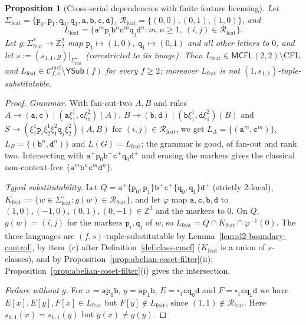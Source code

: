 \documentclass[11pt]{article}
\numberwithin{equation}{section}
\theoremstyle{plain}
\newtheorem{proposition}[theorem]{Proposition}
\theoremstyle{definition}
\theoremstyle{remark}
\newcommand{\Cmcf}[2]{\mathcal{C}^{\mathrm{mcf}}_{#1,#2}}
\newcommand{\blank}{\square}
\newcommand{\YSub}[1]{\mathsf{YSub}(#1)}
\theoremstyle{plain}
\begin{document}
\begin{proposition}[Cross-serial dependencies with finite feature licensing]
\label{prop:feature-cross-typed-v1s}
Let $\Sigma_{\mathrm{feat}}=\{\mathtt p_0,\mathtt p_1,\mathtt q_0,\mathtt q_1,
\mathtt a,\mathtt b,\mathtt c,\mathtt d\}$, $\mathcal R_{\mathrm{feat}}=
\{(0,0),(0,1),(1,0)\}$, and
\[
 L_{\mathrm{feat}}=\{\mathtt a^m\mathtt p_i\mathtt b^n\mathtt c^m\mathtt q_j\mathtt d^n:
 m,n\ge1,\ (i,j)\in\mathcal R_{\mathrm{feat}}\}.
\]
Let $g:\Sigma_{\mathrm{feat}}^*\to\mathbb Z_2^2$ map $\mathtt p_1\mapsto(1,0)$,
$\mathtt q_1\mapsto(0,1)$ and all other letters to $0$, and let
$s:=(s_{1,1},g)|_{\Sigma_{\mathrm{feat}}^+}$ (corestricted to its image).  Then
$L_{\mathrm{feat}}\in\mathsf{MCFL}(2,2)\setminus\mathrm{CFL}$ and
$L_{\mathrm{feat}}\in\Cmcf{f}{s}\setminus\YSub{f}$ for every $f\ge2$; moreover
$L_{\mathrm{feat}}$ is not $(1,s_{1,1})$-tuple-substitutable.
\end{proposition}

\begin{proof}
\emph{Grammar.}  With fan-out-two $A,B$ and rules
$A\to(\mathtt a,\mathtt c)\mid(\mathtt a\xi_1^1,\mathtt c\xi_1^2)(A)$,
$B\to(\mathtt b,\mathtt d)\mid(\mathtt b\xi_1^1,\mathtt d\xi_1^2)(B)$ and
$S\to(\xi_1^1\mathtt p_i\xi_2^1\xi_1^2\mathtt q_j\xi_2^2)(A,B)$ for
$(i,j)\in\mathcal R_{\mathrm{feat}}$, we get $L_A=\{(\mathtt a^m,\mathtt c^m)\}$,
$L_B=\{(\mathtt b^n,\mathtt d^n)\}$ and $L(G)=L_{\mathrm{feat}}$; the grammar is good,
of fan-out and rank two.  Intersecting with $\mathtt a^+\mathtt p_0\mathtt b^+
\mathtt c^+\mathtt q_0\mathtt d^+$ and erasing the markers gives the classical
non-context-free $\{\mathtt a^m\mathtt b^n\mathtt c^m\mathtt d^n\}$.

\emph{Typed substitutability.}  Let
$Q=\mathtt a^+\{\mathtt p_0,\mathtt p_1\}\mathtt b^+\mathtt c^+\{\mathtt q_0,\mathtt q_1\}
\mathtt d^+$ (strictly 2-local), $K_{\mathrm{feat}}:=\{w\in\Sigma_{\mathrm{feat}}^+:
g(w)\in\mathcal R_{\mathrm{feat}}\}$, and let $\varphi$ map
$\mathtt a,\mathtt c,\mathtt b,\mathtt d$ to $(1,0),(-1,0),(0,1),(0,-1)\in\mathbb Z^2$
and the markers to $0$.  On $Q$, $g(w)=(i,j)$ for the markers $\mathtt p_i,\mathtt q_j$
of $w$, so $L_{\mathrm{feat}}=Q\cap K_{\mathrm{feat}}\cap\varphi^{-1}(0)$.  The three
languages are $(f,s)$-tuple-substitutable by Lemma~\ref{lem:sl2-boundary-control},
by item~(c) after Definition~\ref{def:class-cmcf} ($K_{\mathrm{feat}}$ is a union of
$s$-classes), and by Proposition~\ref{prop:abelian-coset-filter}(ii);
Proposition~\ref{prop:abelian-coset-filter}(i) gives the intersection.

\emph{Failure without $g$.}  For $x=\mathtt{ap_0b}$, $y=\mathtt{ap_1b}$,
$E=\blank_1\mathtt{cq_0d}$ and $F=\blank_1\mathtt{cq_1d}$ we have
$E[x],E[y],F[x]\in L_{\mathrm{feat}}$ but $F[y]\notin L_{\mathrm{feat}}$, since
$(1,1)\notin\mathcal R_{\mathrm{feat}}$.  Here $s_{1,1}(x)=s_{1,1}(y)$ but
$g(x)\ne g(y)$.
\end{proof}
\end{document}
